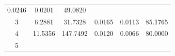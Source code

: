 \documentclass[11pt,]{article}
\begin{document}
\begin{longtable}[]{@{}cccccc@{}}
\begin{minipage}[t]{0.11\columnwidth}
0.0246\strut
\end{minipage} & \begin{minipage}[t]{0.14\columnwidth}\centering\strut
0.0201\strut
\end{minipage} & \begin{minipage}[t]{0.13\columnwidth}\centering\strut
49.0820\strut
\end{minipage}\tabularnewline
\begin{minipage}[t]{0.08\columnwidth}\centering\strut
3\strut
\end{minipage} & \begin{minipage}[t]{0.11\columnwidth}\centering\strut
6.2881\strut
\end{minipage} & \begin{minipage}[t]{0.25\columnwidth}\centering\strut
31.7328\strut
\end{minipage} & \begin{minipage}[t]{0.11\columnwidth}\centering\strut
0.0165\strut
\end{minipage} & \begin{minipage}[t]{0.14\columnwidth}\centering\strut
0.0113\strut
\end{minipage} & \begin{minipage}[t]{0.13\columnwidth}\centering\strut
85.1765\strut
\end{minipage}\tabularnewline
\begin{minipage}[t]{0.08\columnwidth}\centering\strut
4\strut
\end{minipage} & \begin{minipage}[t]{0.11\columnwidth}\centering\strut
11.5356\strut
\end{minipage} & \begin{minipage}[t]{0.25\columnwidth}\centering\strut
147.7492\strut
\end{minipage} & \begin{minipage}[t]{0.11\columnwidth}\centering\strut
0.0120\strut
\end{minipage} & \begin{minipage}[t]{0.14\columnwidth}\centering\strut
0.0066\strut
\end{minipage} & \begin{minipage}[t]{0.13\columnwidth}\centering\strut
80.0000\strut
\end{minipage}\tabularnewline
\begin{minipage}[t]{0.08\columnwidth}\centering\strut
5\strut
\end{minipage} & \begin{minipage}[t]{0.11\columnwidth}\centering\strut

\end{minipage}
\end{longtable}
\end{document}
